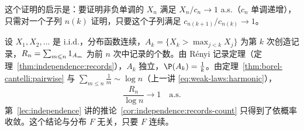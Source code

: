 这个证明的启示是：要证明非负单调的 $X_n$ 满足 $X_n/c_n\to1$ a.s.（$c_n$ 单调递增），只需对一个子列 $n(k)$ 证明，只要这个子列满足 $c_{n(k+1)}/c_{n(k)}\to1$。

\begin{example}[记录的个数]\label{ex:borel-cantelli:records}
设 $X_1,X_2,\dots$ 是 i.i.d.，分布函数连续，$A_k=\{X_k>\max_{j<k}X_j\}$ 为第 $k$ 次创造记录，$R_n=\sum_{m\leqslant n}1_{A_m}$ 为前 $n$ 次中记录的个数。由 Rényi 记录定理（定理~\ref{thm:independence:records}），$A_k$ 独立，$\P(A_k)=\frac1k$。由定理~\ref{thm:borel-cantelli:pairwise} 与 $\sum_{m\leqslant n}\frac1m\sim\log n$（上一讲 \eqref{eq:weak-laws:harmonic}），
\[
\frac{R_n}{\log n}\to1\quad\text{a.s.}
\]
第~\ref{lec:independence} 讲的推论~\ref{cor:independence:records-count} 只得到了依概率收敛。这个结论与分布 $F$ 无关，只要 $F$ 连续。
\end{example}


